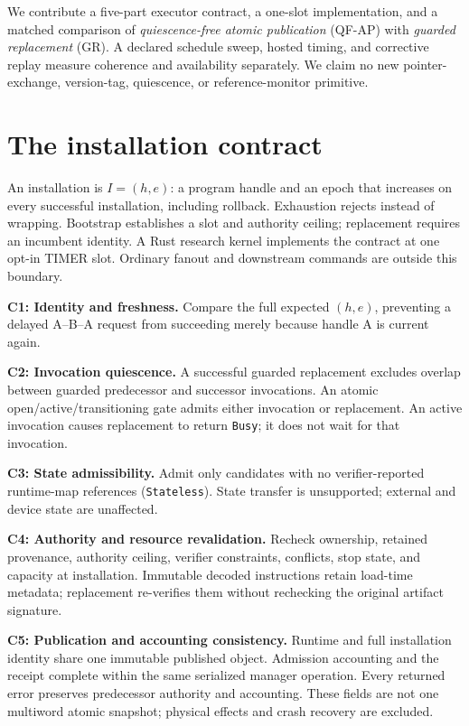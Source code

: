 \documentclass{article}
\begin{document}
We contribute a five-part executor contract, a one-slot implementation, and a matched comparison of \emph{quiescence-free atomic publication} (QF-AP) with \emph{guarded replacement} (GR). A declared schedule sweep, hosted timing, and corrective replay measure coherence and availability separately. We claim no new pointer-exchange, version-tag, quiescence, or reference-monitor primitive.

\section{The installation contract}
An installation is $I=(h,e)$: a program handle and an epoch that increases on every successful installation, including rollback. Exhaustion rejects instead of wrapping. Bootstrap establishes a slot and authority ceiling; replacement requires an incumbent identity. A Rust research kernel implements the contract at one opt-in TIMER slot. Ordinary fanout and downstream commands are outside this boundary.

\textbf{C1: Identity and freshness.} Compare the full expected $(h,e)$, preventing a delayed A--B--A request from succeeding merely because handle A is current again.

\textbf{C2: Invocation quiescence.} A successful guarded replacement excludes overlap between guarded predecessor and successor invocations. An atomic open/active/transitioning gate admits either invocation or replacement. An active invocation causes replacement to return \texttt{Busy}; it does not wait for that invocation.

\textbf{C3: State admissibility.} Admit only candidates with no verifier-reported runtime-map references (\texttt{Stateless}). State transfer is unsupported; external and device state are unaffected.

\textbf{C4: Authority and resource revalidation.} Recheck ownership, retained provenance, authority ceiling, verifier constraints, conflicts, stop state, and capacity at installation. Immutable decoded instructions retain load-time metadata; replacement re-verifies them without rechecking the original artifact signature.

\textbf{C5: Publication and accounting consistency.} Runtime and full installation identity share one immutable published object. Admission accounting and the receipt complete within the same serialized manager operation. Every returned error preserves predecessor authority and accounting. These fields are not one multiword atomic snapshot; physical effects and crash recovery are excluded.
\end{document}
